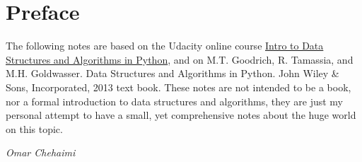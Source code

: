 
\chapter*{Preface}

The following notes are based on the Udacity online course \href{https://www.udacity.com/course/data-structures-and-algorithms-in-python--ud513}{Intro to Data Structures and Algorithms in Python}, and on M.T. Goodrich, R. Tamassia, and M.H. Goldwasser. Data Structures and Algorithms in Python. John Wiley \& Sons, Incorporated, 2013 text book. These notes are not intended to be a book, nor a formal introduction to data structures and algorithms, they are just my personal attempt to have a small, yet comprehensive notes about the huge world on this topic.
 
\begin{flushright}
	\textit{Omar Chehaimi}
\end{flushright}

\hfill

\vfill

\noindent
\textsf{}

\noindent
{}\,